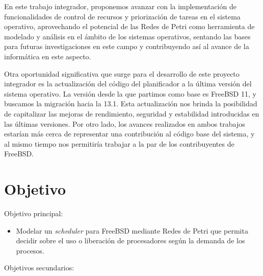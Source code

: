 En este trabajo integrador, proponemos avanzar con la implementación de funcionalidades de control de recursos y priorización de tareas en el sistema operativo, aprovechando el potencial de las Redes de Petri como herramienta de modelado y análisis en el ámbito de los sistemas operativos, sentando las bases para futuras investigaciones en este campo y contribuyendo así al avance de la informática en este aspecto.\par

Otra oportunidad significativa que surge para el desarrollo de este proyecto integrador es la actualización del código del planificador a la última versión del sistema operativo. La versión desde la que partimos como base es FreeBSD 11, y buscamos la migración hacia la 13.1. Esta actualización nos brinda la posibilidad de capitalizar las mejoras de rendimiento, seguridad y estabilidad introducidas en las últimas versiones. Por otro lado, los avances realizados en ambos trabajos estarían más cerca de representar una contribución al código base del sistema, y al mismo tiempo nos permitiría trabajar a la par de los contribuyentes de FreeBSD.\par

\section{Objetivo}

Objetivo principal:

\begin{itemize}
    \item Modelar un \textit{scheduler} para FreeBSD mediante Redes de Petri que permita decidir sobre el uso o liberación de procesadores según la demanda de los procesos.
\end{itemize}


Objetivos secundarios:

